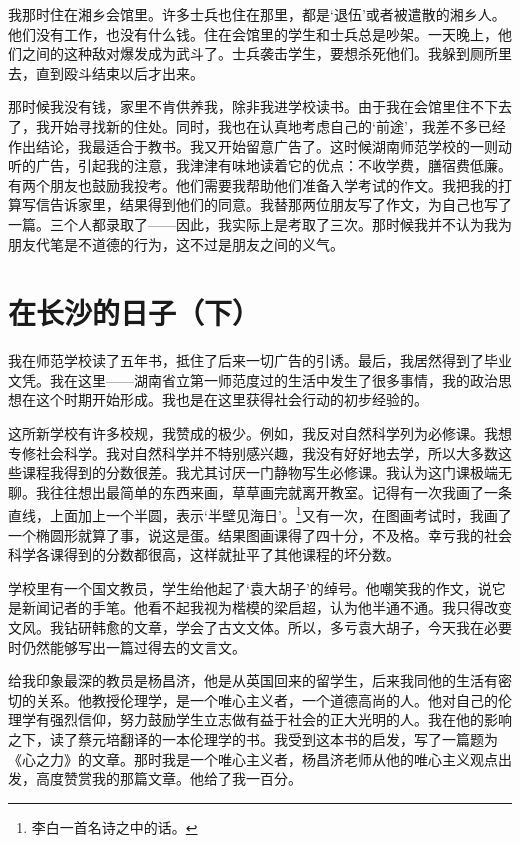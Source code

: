 \documentclass[10pt]{book}
\begin{document}
我那时住在湘乡会馆里。许多士兵也住在那里，都是‘退伍’或者被遣散的湘乡人。他们没有工作，也没有什么钱。住在会馆里的学生和士兵总是吵架。一天晚上，他们之间的这种敌对爆发成为武斗了。士兵袭击学生，要想杀死他们。我躲到厕所里去，直到殴斗结束以后才出来。

那时候我没有钱，家里不肯供养我，除非我进学校读书。由于我在会馆里住不下去了，我开始寻找新的住处。同时，我也在认真地考虑自己的‘前途’，我差不多已经作出结论，我最适合于教书。我又开始留意广告了。这时候湖南师范学校的一则动听的广告，引起我的注意，我津津有味地读着它的优点：不收学费，膳宿费低廉。有两个朋友也鼓励我投考。他们需要我帮助他们准备入学考试的作文。我把我的打算写信告诉家里，结果得到他们的同意。我替那两位朋友写了作文，为自己也写了一篇。三个人都录取了——因此，我实际上是考取了三次。那时候我并不认为我为朋友代笔是不道德的行为，这不过是朋友之间的义气。

\section{在长沙的日子（下）}

我在师范学校读了五年书，抵住了后来一切广告的引诱。最后，我居然得到了毕业文凭。我在这里——湖南省立第一师范度过的生活中发生了很多事情，我的政治思想在这个时期开始形成。我也是在这里获得社会行动的初步经验的。

这所新学校有许多校规，我赞成的极少。例如，我反对自然科学列为必修课。我想专修社会科学。我对自然科学并不特别感兴趣，我没有好好地去学，所以大多数这些课程我得到的分数很差。我尤其讨厌一门静物写生必修课。我认为这门课极端无聊。我往往想出最简单的东西来画，草草画完就离开教室。记得有一次我画了一条直线，上面加上一个半圆，表示‘半壁见海日’。\footnote{李白一首名诗之中的话。}又有一次，在图画考试时，我画了一个椭圆形就算了事，说这是蛋。结果图画课得了四十分，不及格。幸亏我的社会科学各课得到的分数都很高，这样就扯平了其他课程的坏分数。

学校里有一个国文教员，学生绐他起了‘袁大胡子’的绰号。他嘲笑我的作文，说它是新闻记者的手笔。他看不起我视为楷模的梁启超，认为他半通不通。我只得改变文风。我钻研韩愈的文章，学会了古文文体。所以，多亏袁大胡子，今天我在必要时仍然能够写出一篇过得去的文言文。

给我印象最深的教员是杨昌济，他是从英国回来的留学生，后来我同他的生活有密切的关系。他教授伦理学，是一个唯心主义者，一个道德高尚的人。他对自己的伦理学有强烈信仰，努力鼓励学生立志做有益于社会的正大光明的人。我在他的影响之下，读了蔡元培翻译的一本伦理学的书。我受到这本书的启发，写了一篇题为《心之力》的文章。那时我是一个唯心主义者，杨昌济老师从他的唯心主义观点出发，高度赞赏我的那篇文章。他给了我一百分。
\end{document}
